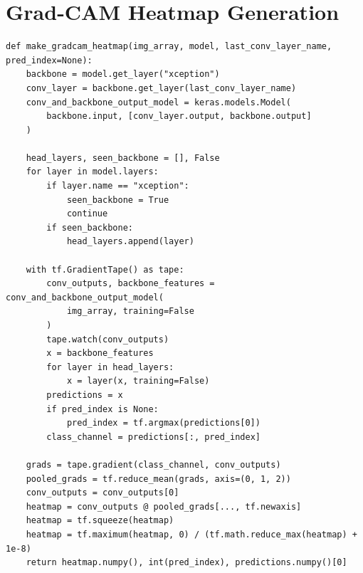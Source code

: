 \documentclass[12pt,a4paper,oneside]{report}
\begin{document}
\section{Grad-CAM Heatmap Generation}
\begin{lstlisting}[caption={Grad-CAM heatmap computation using a gradient tape over the last convolutional layer.}]
def make_gradcam_heatmap(img_array, model, last_conv_layer_name, pred_index=None):
    backbone = model.get_layer("xception")
    conv_layer = backbone.get_layer(last_conv_layer_name)
    conv_and_backbone_output_model = keras.models.Model(
        backbone.input, [conv_layer.output, backbone.output]
    )

    head_layers, seen_backbone = [], False
    for layer in model.layers:
        if layer.name == "xception":
            seen_backbone = True
            continue
        if seen_backbone:
            head_layers.append(layer)

    with tf.GradientTape() as tape:
        conv_outputs, backbone_features = conv_and_backbone_output_model(
            img_array, training=False
        )
        tape.watch(conv_outputs)
        x = backbone_features
        for layer in head_layers:
            x = layer(x, training=False)
        predictions = x
        if pred_index is None:
            pred_index = tf.argmax(predictions[0])
        class_channel = predictions[:, pred_index]

    grads = tape.gradient(class_channel, conv_outputs)
    pooled_grads = tf.reduce_mean(grads, axis=(0, 1, 2))
    conv_outputs = conv_outputs[0]
    heatmap = conv_outputs @ pooled_grads[..., tf.newaxis]
    heatmap = tf.squeeze(heatmap)
    heatmap = tf.maximum(heatmap, 0) / (tf.math.reduce_max(heatmap) + 1e-8)
    return heatmap.numpy(), int(pred_index), predictions.numpy()[0]
\end{lstlisting}
\end{document}
